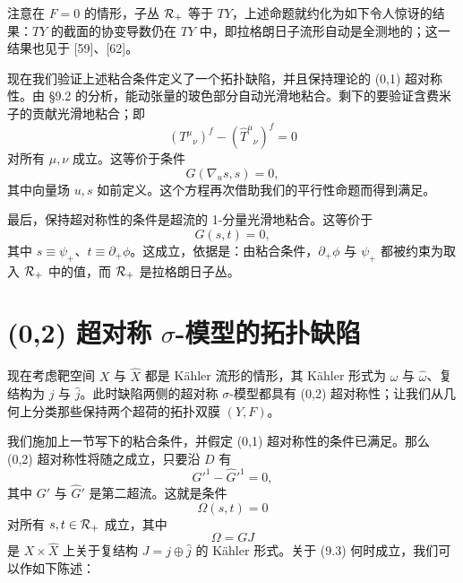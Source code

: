 注意在 $F=0$ 的情形，子丛 $\mathcal{R}_+$ 等于 $TY$，上述命题就约化为如下令人惊讶的结果：$TY$ 的截面的协变导数仍在 $TY$ 中，即拉格朗日子流形自动是全测地的；这一结果也见于 [59]、[62]。

现在我们验证上述粘合条件定义了一个拓扑缺陷，并且保持理论的 (0,1) 超对称性。由 §9.2 的分析，能动张量的玻色部分自动光滑地粘合。剩下的要验证含费米子的贡献光滑地粘合；即
\[
(T^\mu{}_\nu)^f-(\hat T^\mu{}_\nu)^f=0
\]
对所有 $\mu,\nu$ 成立。这等价于条件
\[
G(\nabla_u s,s)=0,
\]
其中向量场 $u,s$ 如前定义。这个方程再次借助我们的平行性命题而得到满足。

最后，保持超对称性的条件是超流的 1-分量光滑地粘合。这等价于
\[
G(s,t)=0,
\]
其中 $s\equiv\psi_+$、$t\equiv\partial_+\phi$。这成立，依据是：由粘合条件，$\partial_+\phi$ 与 $\psi_+$ 都被约束为取入 $\mathcal{R}_+$ 中的值，而 $\mathcal{R}_+$ 是拉格朗日子丛。

\section{(0,2) 超对称 \texorpdfstring{$\sigma$}{σ}-模型的拓扑缺陷}

现在考虑靶空间 $X$ 与 $\hat X$ 都是 Kähler 流形的情形，其 Kähler 形式为 $\omega$ 与 $\hat\omega$、复结构为 $j$ 与 $\hat j$。此时缺陷两侧的超对称 $\sigma$-模型都具有 (0,2) 超对称性；让我们从几何上分类那些保持两个超荷的拓扑双膜 $(Y,F)$。

我们施加上一节写下的粘合条件，并假定 (0,1) 超对称性的条件已满足。那么 (0,2) 超对称性将随之成立，只要沿 $D$ 有
\[
G'^1-\hat G'^1=0,
\]
其中 $G'$ 与 $\hat G'$ 是第二超流。这就是条件
\begin{equation}
\Omega(s,t)=0 \tag{9.3}
\end{equation}
对所有 $s,t\in\mathcal{R}_+$ 成立，其中
\[
\Omega=GJ
\]
是 $X\times\hat X$ 上关于复结构 $J=j\oplus\hat j$ 的 Kähler 形式。关于 (9.3) 何时成立，我们可以作如下陈述：

